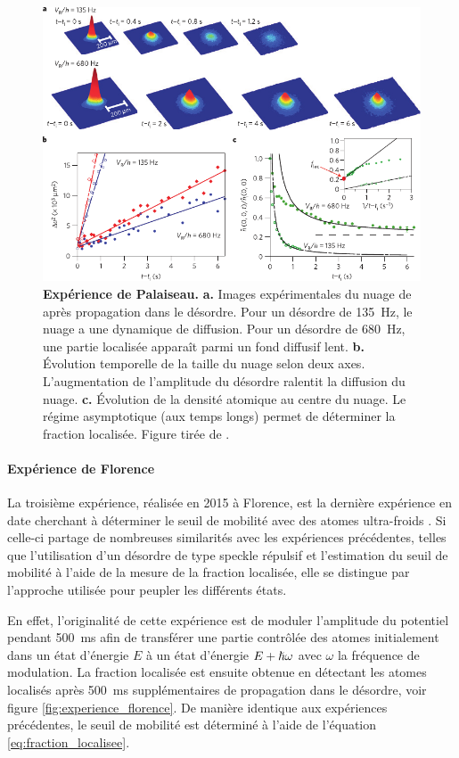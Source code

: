 \begin{figure}
\centering
\includegraphics[width=\textwidth]{Fig/Localisation/experience_palaiseau.pdf}
\caption{\textbf{Expérience de Palaiseau.} \textbf{a.} Images expérimentales du nuage de  après propagation dans le désordre. Pour un désordre de \SI{135}{\hertz}, le nuage a une dynamique de diffusion. Pour un désordre de \SI{680}{\hertz}, une partie localisée apparaît parmi un fond diffusif lent. \textbf{b.} Évolution temporelle de la taille du nuage selon deux axes. L'augmentation de l'amplitude du désordre ralentit la diffusion du nuage. \textbf{c.} Évolution de la densité atomique au centre du nuage. Le régime asymptotique (aux temps longs) permet de déterminer la fraction localisée. Figure tirée de \citep{jendrzejewski2012three}.}
\label{fig:experience_palaiseau}
\end{figure}


\paragraph*{Expérience de Florence}
La troisième expérience, réalisée en 2015 à Florence, est la dernière expérience en date cherchant à déterminer le seuil de mobilité avec des atomes ultra-froids \citep{semeghini2015measurement}. Si celle-ci partage de nombreuses similarités avec les expériences précédentes, telles que l'utilisation d'un désordre de type speckle répulsif et l'estimation du seuil de mobilité à l'aide de la mesure de la fraction localisée, elle se distingue par l'approche utilisée pour peupler les différents états. 

En effet, l'originalité de cette expérience est de moduler l'amplitude du potentiel pendant \SI{500}{\milli\second} afin de transférer une partie contrôlée des atomes initialement dans un état d'énergie $E$ à un état d'énergie $E+\hslash \omega$ avec $\omega$ la fréquence de modulation. La fraction localisée est ensuite obtenue en détectant les atomes localisés après \SI{500}{\milli\second} supplémentaires de propagation dans le désordre, voir figure \ref{fig:experience_florence}. De manière identique aux expériences précédentes, le seuil de mobilité est déterminé à l'aide de l'équation \ref{eq:fraction_localisee}.

